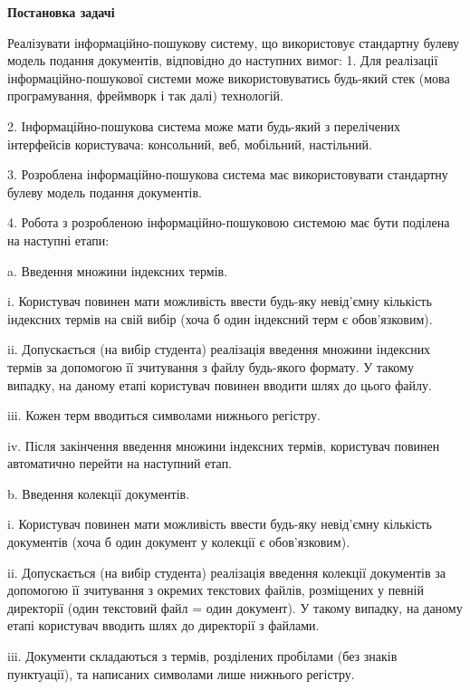 \documentclass{../../templates/information_retrieval_lab}
\begin{document}


\newcommand{\labNo}{1}

\newcommand{\labTopic}{РЕАЛІЗАЦІЯ ТЕОРЕТИКО-МНОЖИННОЇ МОДЕЛІ ПОДАННЯ ДОКУМЕНТІВ}



\centerline{\textbf{Постановка задачі}}

Реалізувати інформаційно-пошукову систему, що використовує стандартну
булеву модель подання документів, відповідно до наступних вимог:
1. Для реалізації інформаційно-пошукової системи може
використовуватись будь-який стек (мова програмування, фреймворк і
так далі) технологій.

2. Інформаційно-пошукова система може мати будь-який з перелічених
інтерфейсів користувача: консольний, веб, мобільний, настільний.

3. Розроблена інформаційно-пошукова система має використовувати
стандартну булеву модель подання документів.

4. Робота з розробленою інформаційно-пошуковою системою має бути
поділена на наступні етапи:

a. Введення множини індексних термів.

i. Користувач повинен мати можливість ввести будь-яку
невід’ємну кількість індексних термів на свій вибір (хоча б один
індексний терм є обов’язковим).

ii. Допускається (на вибір студента) реалізація введення множини
індексних термів за допомогою її зчитування з файлу будь-якого
формату. У такому випадку, на даному етапі користувач повинен
вводити шлях до цього файлу.

iii. Кожен терм вводиться символами нижнього регістру.

iv. Після закінчення введення множини індексних термів,
користувач повинен автоматично перейти на наступний етап.

b. Введення колекції документів.

i. Користувач повинен мати можливість ввести будь-яку
невід’ємну кількість документів (хоча б один документ у колекції
є обов’язковим).

ii. Допускається (на вибір студента) реалізація введення колекції
документів за допомогою її зчитування з окремих текстових
файлів, розміщених у певній директорії (один текстовий файл =
один документ). У такому випадку, на даному етапі користувач
вводить шлях до директорії з файлами.

iii. Документи складаються з термів, розділених пробілами (без
знаків пунктуації), та написаних символами лише нижнього
регістру.
\end{document}
